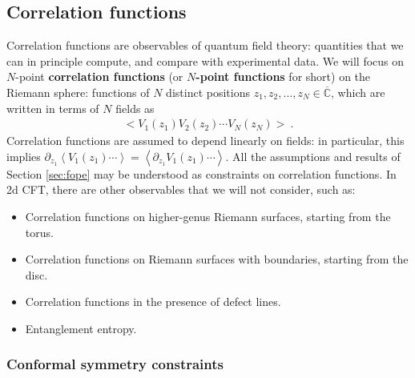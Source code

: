 \documentclass[12pt, a4paper]{article}
\newcommand{\myindex}[1]{\textbf{\boldmath #1}}
\begin{document}
\subsection{Correlation functions}\label{sec:cor}

Correlation functions are observables of quantum field theory: quantities that we can in principle compute, and compare with experimental data. We will focus on $N$-point \myindex{correlation functions} (or \myindex{$N$-point functions} for short) on the Riemann sphere: functions of $N$ distinct positions $z_1,z_2,\dots, z_N\in \overline{\mathbb{C}}$, which are written in terms of $N$ fields as
\begin{align}
 \Big< V_1(z_1) V_2(z_2) \cdots V_N(z_N)\Big>\ . 
\end{align}
Correlation functions are assumed to depend linearly on fields: in particular, this implies $\partial_{z_1}\left<  V_1(z_1) \cdots \right> = \left< \partial_{z_1} V_1(z_1) \cdots \right>$.
All the assumptions and results of Section \ref{sec:fope} may be understood as constraints on correlation functions. 
In 2d CFT, there are other observables that we will not consider, such as: 
\begin{itemize}
 \item Correlation functions on higher-genus Riemann surfaces, starting from the torus.
 \item Correlation functions on Riemann surfaces with boundaries, starting from the disc.
 \item Correlation functions in the presence of defect lines. 
 \item Entanglement entropy. 
\end{itemize}

\subsubsection{Conformal symmetry constraints}\label{sec:csc}
\end{document}
